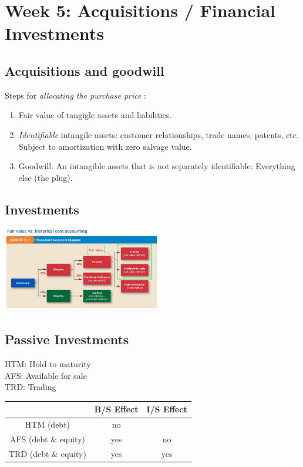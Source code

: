 \section*{Week 5: Acquisitions / Financial Investments}

\subsection*{Acquisitions and goodwill}


Steps for \textit{allocating the purchase price} :
\begin{enumerate}[noitemsep,topsep=0pt]
	\item Fair value of tangigle assets and liabilities.
	\item \textit{Identifiable} intangile assets: customer relationships, trade names, patents, etc. Subject to amortization with zero salvage value.
	\item Goodwill.  An intangible assets that is not separately identifiable: Everything else (the plug).
\end{enumerate}

\subsection*{Investments}

\includegraphics[width=7cm]{assets/fair_value_vs_historical_acct}

\subsection*{Passive Investments}

HTM: Hold to maturity \\
AFS: Available for sale \\
TRD: Trading 

	\begin{tabular}{ |c|c|c| } 
		\hline
			  & B/S Effect & I/S Effect \\ 
		\hline
		HTM (debt) & no &  \\ 
		AFS (debt \& equity) & yes & no \\ 
		TRD (debt \& equity) & yes & yes \\ 
		\hline
	\end{tabular} 

